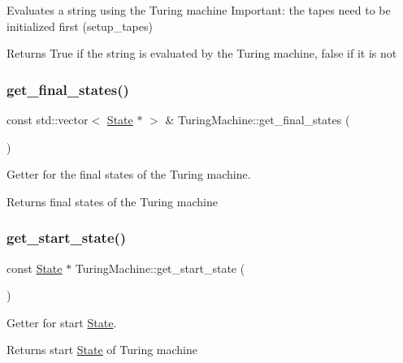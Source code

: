 Evaluates a string using the Turing machine Important\+: the tapes need to be initialized first (setup\+\_\+tapes) 

\begin{DoxyReturn}{Returns}
True if the string is evaluated by the Turing machine, false if it is not 
\end{DoxyReturn}
\mbox{\label{classTuringMachine_ab34c3253e9d158d91a8d2e4473267761}} 
\subsubsection{\texorpdfstring{get\+\_\+final\+\_\+states()}{get\_final\_states()}}
{\footnotesize\ttfamily const std\+::vector$<$ \hyperlink{classState}{State} $\ast$ $>$ \& Turing\+Machine\+::get\+\_\+final\+\_\+states (\begin{DoxyParamCaption}{ }\end{DoxyParamCaption})}



Getter for the final states of the Turing machine. 

\begin{DoxyReturn}{Returns}
final states of the Turing machine 
\end{DoxyReturn}
\mbox{\label{classTuringMachine_a596149a33ff6f9c49100c71977ad16c6}} 
\subsubsection{\texorpdfstring{get\+\_\+start\+\_\+state()}{get\_start\_state()}}
{\footnotesize\ttfamily const \hyperlink{classState}{State} $\ast$ Turing\+Machine\+::get\+\_\+start\+\_\+state (\begin{DoxyParamCaption}{ }\end{DoxyParamCaption})}



Getter for start \hyperlink{classState}{State}. 

\begin{DoxyReturn}{Returns}
start \hyperlink{classState}{State} of Turing machine 
\end{DoxyReturn}
\mbox{\label{classTuringMachine_add19f4c90678b56d5a78d0e88c389cd8}} 
